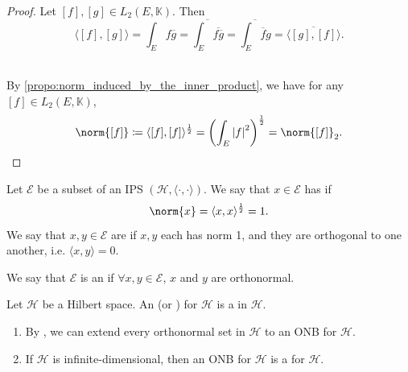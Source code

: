 \documentclass[notoc,notitlepage]{tufte-book}
\begin{document}
\begin{proof}
  \noindent
   Let $[f], [g] \in L_2(E, \mathbb{K})$.
  Then
  \begin{equation*}
    \langle [f], [g] \rangle
    = \int_{E} f \overline{g}
    = \overline{\int_{E} \overline{f \overline{g}} }
    = \overline{\int_{E} \overline{f} g}
    = \overline{\langle [g], [f] \rangle}.
  \end{equation*}

  \noindent
   \\ \noindent
  By \cref{propo:norm_induced_by_the_inner_product}, we have
  for any $[f] \in L_2(E, \mathbb{K})$,
  \begin{equation*}
    \norm{[f]} \coloneqq \langle [f], [f] \rangle^{\frac{1}{2}}
    = \left( \int_{E} \abs{f}^2 \right)^{\frac{1}{2}} = \norm{[f]}_2.
  \end{equation*}
\end{proof}

\begin{defn}[Orthonormality]\label{defn:orthonormality}
  Let $\mathcal{E}$ be a subset of an IPS
  $(\mathcal{H}, \langle \cdot, \cdot \rangle)$.
  We say that $x \in \mathcal{E}$ has  if
  \begin{equation*}
    \norm{x} = \langle x, x \rangle^{\frac{1}{2}} = 1.
  \end{equation*}
  We say that $x, y \in \mathcal{E}$ are 
  if $x, y$ each has norm 1, and they are orthogonal to one another,
  i.e. $\langle x, y \rangle = 0$.

  We say that $\mathcal{E}$ is an 
  if $\forall x, y \in \mathcal{E}$, $x$ and $y$ are orthonormal.
\end{defn}

\begin{defn}\label{defn:orthonormal_basis}
  Let $\mathcal{H}$ be a Hilbert space.
  An  (or ) for $\mathcal{H}$ 
  is a  in $\mathcal{H}$.
\end{defn}

\begin{remark}
  \begin{enumerate}
    \item By ,
      we can extend every orthonormal set in $\mathcal{H}$ to an ONB for $\mathcal{H}$.
    \item If $\mathcal{H}$ is infinite-dimensional, then an ONB for $\mathcal{H}$ 
      is  a 
      for $\mathcal{H}$.
  \end{enumerate}
\end{remark}
\end{document}
